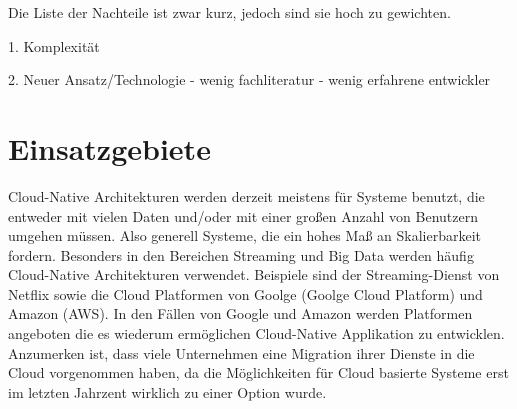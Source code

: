 Die Liste der Nachteile ist zwar kurz, jedoch sind sie hoch zu gewichten.

1. Komplexität


2. Neuer Ansatz/Technologie
- wenig fachliteratur
- wenig erfahrene entwickler


\section{Einsatzgebiete}
Cloud-Native Architekturen werden derzeit meistens für Systeme benutzt, die entweder mit vielen Daten und/oder mit einer großen Anzahl von Benutzern umgehen müssen. Also generell Systeme, die ein hohes Maß an Skalierbarkeit fordern. Besonders in den Bereichen Streaming und Big Data werden häufig Cloud-Native Architekturen verwendet. 
Beispiele sind der Streaming-Dienst von Netflix sowie die Cloud Platformen von Goolge (Goolge Cloud Platform) und Amazon (AWS). In den Fällen von Google und Amazon werden Platformen angeboten die es wiederum ermöglichen Cloud-Native Applikation zu entwicklen.
Anzumerken ist, dass viele Unternehmen eine Migration ihrer Dienste in die Cloud vorgenommen haben, da die Möglichkeiten für Cloud basierte Systeme erst im letzten Jahrzent wirklich zu einer Option wurde. 
